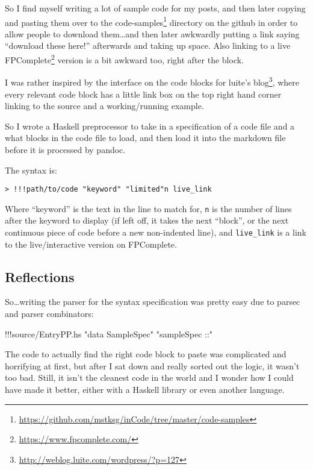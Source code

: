 \documentclass[]{article}
\newenvironment{Shaded}{}{}
\newcommand{\StringTok}[1]{\textcolor[rgb]{0.25,0.44,0.63}{{#1}}}
\newcommand{\FunctionTok}[1]{\textcolor[rgb]{0.02,0.16,0.49}{{#1}}}
\newcommand{\NormalTok}[1]{{#1}}
\renewcommand{\href}[2]{#2\footnote{\url{#1}}}
\begin{document}
So I find myself writing a lot of sample code for my posts, and then
later copying and pasting them over to the
\href{https://github.com/mstksg/inCode/tree/master/code-samples}{code-samples}
directory on the github in order to allow people to download
them\ldots{}and then later awkwardly putting a link saying ``download
these here!'' afterwards and taking up space. Also linking to a live
\href{https://www.fpcomplete.com/}{FPComplete} version is a bit awkward
too, right after the block.

I was rather inspired by the interface on the code blocks for
\href{http://weblog.luite.com/wordpress/?p=127}{luite's blog}, where
every relevant code block has a little link box on the top right hand
corner linking to the source and a working/running example.

So I wrote a Haskell preprocessor to take in a specification of a code
file and a what blocks in the code file to load, and then load it into
the markdown file before it is processed by pandoc.

The syntax is:

\begin{verbatim}
> !!!path/to/code "keyword" "limited"n live_link
\end{verbatim}

Where ``keyword'' is the text in the line to match for, \texttt{n} is
the number of lines after the keyword to display (if left off, it takes
the next ``block'', or the next continuous piece of code before a new
non-indented line), and \texttt{live\_link} is a link to the
live/interactive version on FPComplete.

\subsection{Reflections}\label{reflections}

So\ldots{}writing the parser for the syntax specification was pretty
easy due to parsec and parser combinators:

\begin{Shaded}
\begin{Highlighting}[]
\FunctionTok{!!!}\NormalTok{source}\FunctionTok{/}\NormalTok{EntryPP.hs }\StringTok{"data SampleSpec"} \StringTok{"sampleSpec ::"}
\end{Highlighting}
\end{Shaded}

The code to actually find the right code block to paste was complicated
and horrifying at first, but after I sat down and really sorted out the
logic, it wasn't too bad. Still, it isn't the cleanest code in the world
and I wonder how I could have made it better, either with a Haskell
library or even another language.
\end{document}
